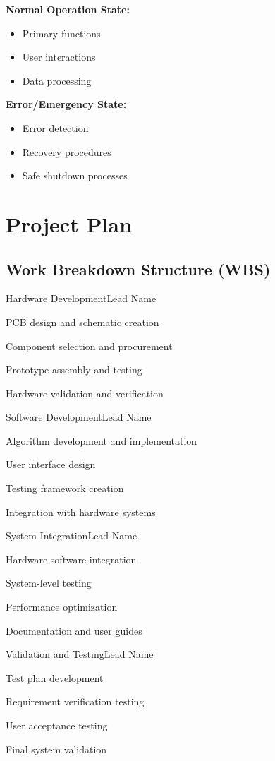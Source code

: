 \documentclass[final]{../designreport}
\newcommand{\projectplan}{\section{Project Plan}}
\newcommand{\workbreakdown}{\subsection{Work Breakdown Structure (WBS)}}
\begin{document}
\textbf{Normal Operation State:}
\begin{itemize}
    \item Primary functions
    \item User interactions
    \item Data processing
\end{itemize}

\textbf{Error/Emergency State:}
\begin{itemize}
    \item Error detection
    \item Recovery procedures
    \item Safe shutdown processes
\end{itemize}

\projectplan

\workbreakdown

\begin{subproject}{Hardware Development}{Lead Name}
    \item PCB design and schematic creation
    \item Component selection and procurement
    \item Prototype assembly and testing
    \item Hardware validation and verification
\end{subproject}

\begin{subproject}{Software Development}{Lead Name}
    \item Algorithm development and implementation
    \item User interface design
    \item Testing framework creation
    \item Integration with hardware systems
\end{subproject}

\begin{subproject}{System Integration}{Lead Name}
    \item Hardware-software integration
    \item System-level testing
    \item Performance optimization
    \item Documentation and user guides
\end{subproject}

\begin{subproject}{Validation and Testing}{Lead Name}
    \item Test plan development
    \item Requirement verification testing
    \item User acceptance testing
    \item Final system validation
\end{subproject}
\end{document}
